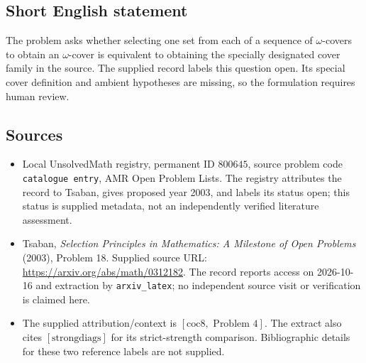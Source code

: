 \documentclass[11pt]{article}
\begin{document}
\subsection{Short English statement}
The problem asks whether selecting one set from each of a sequence of \(\omega\)-covers to obtain an \(\omega\)-cover is equivalent to obtaining the specially designated cover family in the source. The supplied record labels this question open. Its special cover definition and ambient hypotheses are missing, so the formulation requires human review.
\subsection{Sources}
\begin{itemize}
\item Local UnsolvedMath registry, permanent ID \(800645\), source problem code \texttt{catalogue entry}, AMR Open Problem Lists. The registry attributes the record to Tsaban, gives proposed year 2003, and labels its status open; this status is supplied metadata, not an independently verified literature assessment.
\item Tsaban, \emph{Selection Principles in Mathematics: A Milestone of Open Problems} (2003), Problem 18. Supplied source URL: \url{https://arxiv.org/abs/math/0312182}. The record reports access on 2026-10-16 and extraction by \texttt{arxiv\_latex}; no independent source visit or verification is claimed here.
\item The supplied attribution/context is \([\mathrm{coc8},\text{ Problem }4]\). The extract also cites \([\mathrm{strongdiags}]\) for its strict-strength comparison. Bibliographic details for these two reference labels are not supplied.
\end{itemize}
\end{document}
